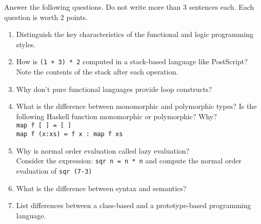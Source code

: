 Answer the following questions. Do not write more than 3 sentences each. Each question is worth 2 points.
\begin{enumerate}

\item Distinguish the key characteristics of the functional and logic programming styles.
\vspace{5cm}

\item How is \texttt{(1 + 3) * 2} computed in a stack-based language like PostScript? Note the contents of the stack after each operation.
\vspace{5cm}

\item Why don't pure functional languages provide loop constructs?
\vspace{5cm}

\newpage
\item
What is the difference between monomorphic and polymorphic types? Is the following Haskell function monomorphic or polymorphic? Why?\\
\texttt{map f [ ] = [ ]}\\
\texttt{map f (x:xs) = f x : map f xs} 
\vspace{5cm}



\item Why is normal order evaluation called lazy evaluation? \\
Consider the expression: \texttt{sqr n = n * n} and compute the normal order evaluation of \texttt{sqr (7-3)}
\vspace{5cm}

\item What is the difference between syntax and semantics?
\vspace{5cm}

\newpage

\item List differences between a class-based and a prototype-based programming language.
\vspace{5cm}


\end{enumerate}
